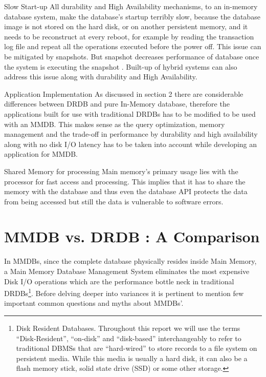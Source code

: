 \documentclass[12pt]{article} %
\begin{document}
\begin{description}
\item {Slow Start-up}
All durability and High Availability mechanisms, to an in-memory database system, make the database's startup terribly slow, because the database image is not stored on the hard disk, or on another persistent memory, and it needs to be reconstruct at every reboot, for example by reading the transaction log file and repeat all the operations executed before the power off. This issue can be mitigated by snapshots. But snapshot decreases performance of database once the system is executing the snapshot \cite{Mcobject-Myths}. Built-up of hybrid systems can also address this issue along with durability and High Availability. 

\item {Application Implementation}
As discussed in section 2 there are considerable differences between DRDB and pure In-Memory database, therefore the applications built for use with traditional DRDBs has to be modified to be used with an MMDB. This makes sense as the query optimization, memory management and the trade-off in performance by durability and high availability along with no disk I/O latency has to be taken into account while developing an application for MMDB. 

\item {Shared Memory for processing}
Main memory's primary usage lies with the processor for fast access and processing. This implies that it has to share the memory with the database and thus even the database API protects the data from being accessed but still the data is vulnerable to software errors. 

\end{description}


\section{MMDB vs. DRDB : A Comparison}
In MMDBs, since the complete database physically resides inside Main Memory, a Main Memory Database Management System eliminates the most expensive Disk I/O operations which are the performance bottle neck in traditional DRDBs\footnote{Disk Resident Databases. Throughout this report we will use the terms “Disk-Resident”, “on-disk” and “disk-based” interchangeably to refer to traditional DBMSs that are “hard-wired” to store records to a file system on persistent media. While this media is usually a hard disk, it can also be a flash memory stick, solid state drive (SSD) or some other storage.}. Before delving deeper into variances it is pertinent to mention few important common questions and myths about MMDBs’.
\end{document}
